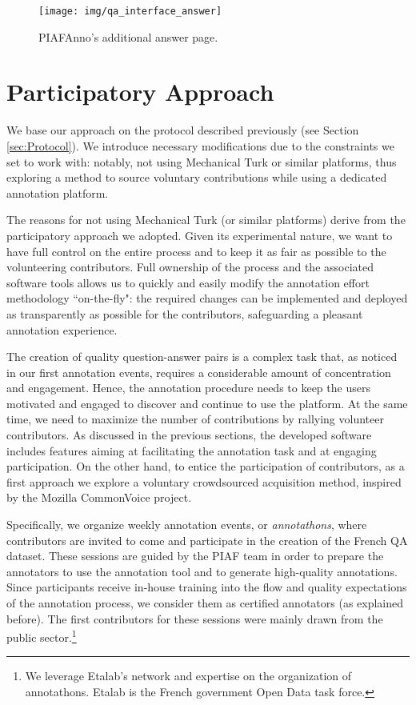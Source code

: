 \documentclass[10pt, a4paper]{article}
\begin{document}
\begin{figure}[t!]
	\centering
	\texttt{[image: img/qa\_interface\_answer]}
	\caption{PIAFAnno's additional answer page.}
	\label{fig:qainterface2}
\end{figure}

\section{Participatory Approach}
\label{sec:crowdsourcing}
We base our approach on the protocol described previously (see Section \ref{sec:Protocol}). We introduce necessary modifications due to the constraints we set to work with: notably, not using Mechanical Turk or similar platforms, thus exploring a method to source voluntary contributions while using a dedicated annotation platform.

The reasons for not using Mechanical Turk (or similar platforms) derive from the participatory approach we adopted. Given its experimental nature, we want to have full control on the entire process and to keep it as fair as possible to the volunteering contributors. Full ownership of the process and the associated software tools allows us to quickly and easily modify the annotation effort methodology ``on-the-fly": the required changes can be implemented and deployed as transparently as possible for the contributors, safeguarding a pleasant annotation experience. 

The creation of quality question-answer pairs is a complex task that, as noticed in our first annotation events, requires a considerable amount of concentration and engagement. Hence, the annotation procedure needs to keep the users motivated and engaged to discover and continue to use the platform. At the same time, we need to maximize the number of contributions by rallying volunteer contributors. As discussed in the previous sections, the developed software includes features aiming at facilitating the annotation task and at engaging participation. On the other hand, to entice the participation of contributors, as a first approach we explore a voluntary crowdsourced acquisition method, inspired by the Mozilla CommonVoice project. 

Specifically, we organize weekly annotation events, or \textit{annotathons}, where contributors are invited to come and participate in the creation of the French QA dataset. These sessions are guided by the PIAF team in order to prepare the annotators to use the annotation tool and to generate high-quality annotations. Since participants receive in-house training into the flow and quality expectations of the annotation process, we consider them as certified annotators (as explained before). The first contributors for these sessions were mainly drawn from the public sector.\footnote{We leverage Etalab's network and expertise on the organization of annotathons. Etalab is the French government Open Data task force.}
\end{document}
